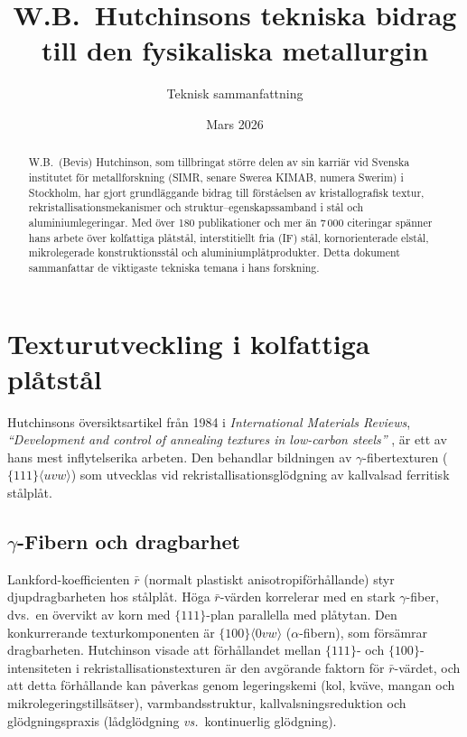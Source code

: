 \documentclass[11pt,a4paper]{article}
\title{W.B.\ Hutchinsons tekniska bidrag \\
       till den fysikaliska metallurgin}
\author{Teknisk sammanfattning}
\date{Mars 2026}
\begin{document}
\maketitle

\begin{abstract}
W.B.\ (Bevis) Hutchinson, som tillbringat st\"orre delen av sin
karri\"ar vid Svenska institutet f\"or metallforskning (SIMR, senare
Swerea KIMAB, numera Swerim) i Stockholm, har gjort grundl\"aggande
bidrag till f\"orst\aa{}elsen av kristallografisk textur,
rekristallisationsmekanismer och struktur--egenskapssamband i st\aa{}l
och aluminiumlegeringar.  Med \"over 180 publikationer och mer \"an
7\,000 citeringar sp\"anner hans arbete \"over kolfattiga pl\aa{}tst\aa{}l,
interstitiellt fria (IF) st\aa{}l, kornorienterade elst\aa{}l,
mikrolegerade konstruktionsst\aa{}l och aluminiumpl\aa{}tprodukter.
Detta dokument sammanfattar de viktigaste tekniska temana i hans
forskning.
\end{abstract}

\section{Texturutveckling i kolfattiga pl\aa{}tst\aa{}l}
\label{sec:bcc-texture}

Hutchinsons \"oversiktsartikel fr\aa{}n 1984 i \emph{International
Materials Reviews}, \emph{``Development and control of annealing textures
in low-carbon steels''} \cite{Hutchinson1984IMR}, \"ar ett av hans mest
inflytelserika arbeten.  Den behandlar bildningen av
$\gamma$-fibertexturen ($\{111\}\langle uvw\rangle$) som utvecklas vid
rekristallisationsgl\"odgning av kallvalsad ferritisk st\aa{}lpl\aa{}t.

\subsection{$\gamma$-Fibern och dragbarhet}

Lankford-koefficienten $\bar{r}$ (normalt plastiskt anisotropif\"orh\aa{}llande)
styr djupdragbarheten hos st\aa{}lpl\aa{}t.  H\"oga $\bar{r}$-v\"arden
korrelerar med en stark $\gamma$-fiber, dvs.\ en \"overvikt av korn med
$\{111\}$-plan parallella med pl\aa{}tytan.  Den konkurrerande
texturkomponenten \"ar $\{100\}\langle 0vw\rangle$ ($\alpha$-fibern), som
f\"ors\"amrar dragbarheten.  Hutchinson visade att f\"orh\aa{}llandet
mellan $\{111\}$- och $\{100\}$-intensiteten i rekristallisations\-texturen
\"ar den avg\"orande faktorn f\"or $\bar{r}$-v\"ardet, och att detta
f\"orh\aa{}llande kan p\aa{}verkas genom legeringskemi (kol, kv\"ave,
mangan och mikrolegeringstills\"atser), varmbandsstruktur,
kallvalsningsreduktion och gl\"odgningspraxis (l\aa{}dgl\"odgning
\emph{vs.}\ kontinuerlig gl\"odgning).
\end{document}
